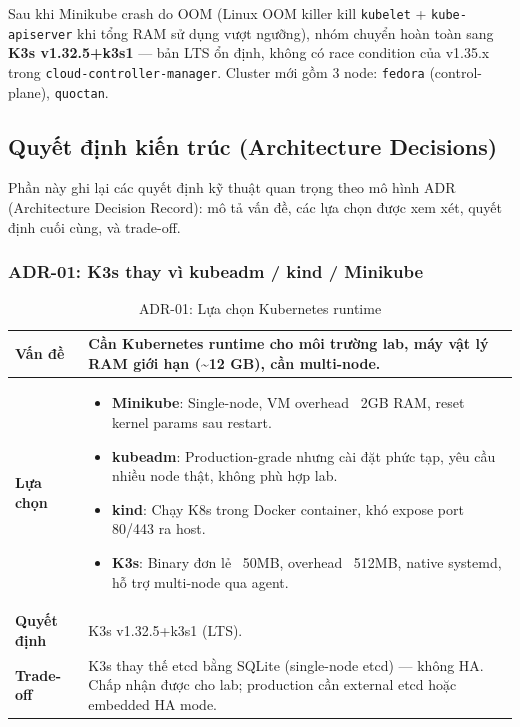 Sau khi Minikube crash do OOM (Linux OOM killer kill \texttt{kubelet} + \texttt{kube-apiserver} khi tổng RAM sử dụng vượt ngưỡng), nhóm chuyển hoàn toàn sang \textbf{K3s v1.32.5+k3s1} — bản LTS ổn định, không có race condition của v1.35.x trong \texttt{cloud-controller-manager}. Cluster mới gồm 3 node: \texttt{fedora} (control-plane), \texttt{quoctan}.

\subsection{Quyết định kiến trúc (Architecture Decisions)}

Phần này ghi lại các quyết định kỹ thuật quan trọng theo mô hình ADR (Architecture Decision Record): mô tả vấn đề, các lựa chọn được xem xét, quyết định cuối cùng, và trade-off.

\subsubsection*{ADR-01: K3s thay vì kubeadm / kind / Minikube}

\begin{table}[H]
\centering
\renewcommand{\arraystretch}{1.3}
\begin{tabular}{|p{3cm}|p{12.5cm}|}
\hline
\textbf{Vấn đề} & Cần Kubernetes runtime cho môi trường lab, máy vật lý RAM giới hạn (\textasciitilde{}12 GB), cần multi-node. \\
\hline
\textbf{Lựa chọn} &
\begin{itemize}[noitemsep,topsep=0pt]
  \item \textbf{Minikube}: Single-node, VM overhead ~2GB RAM, reset kernel params sau restart.
  \item \textbf{kubeadm}: Production-grade nhưng cài đặt phức tạp, yêu cầu nhiều node thật, không phù hợp lab.
  \item \textbf{kind}: Chạy K8s trong Docker container, khó expose port 80/443 ra host.
  \item \textbf{K3s}: Binary đơn lẻ ~50MB, overhead ~512MB, native systemd, hỗ trợ multi-node qua agent.
\end{itemize} \\
\hline
\textbf{Quyết định} & K3s v1.32.5+k3s1 (LTS). \\
\hline
\textbf{Trade-off} & K3s thay thế etcd bằng SQLite (single-node etcd) — không HA. Chấp nhận được cho lab; production cần external etcd hoặc embedded HA mode. \\
\hline
\end{tabular}
\caption{ADR-01: Lựa chọn Kubernetes runtime}
\end{table}

